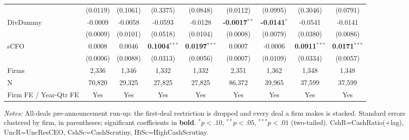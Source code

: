 \begin{landscape}
\begin{table}[htbp]
\begin{adjustbox}{max width=\linewidth}
\begin{tabular}{lcccccccc}
 & (0.0119) & (0.1061) & (0.3375) & (0.0848) & (0.0112) & (0.0995) & (0.3046) & (0.0791)  \\
DivDummy & -0.0009 & -0.0058 & -0.0593 & -0.0128 & \textbf{-0.0017}$^{**}$ & \textbf{-0.0141}$^{*}$ & -0.0541 & -0.0141  \\
 & (0.0009) & (0.0101) & (0.0518) & (0.0104) & (0.0008) & (0.0079) & (0.0380) & (0.0086)  \\
sCFO & 0.0008 & 0.0046 & \textbf{0.1004}$^{***}$ & \textbf{0.0197}$^{***}$ & 0.0007 & -0.0006 & \textbf{0.0911}$^{***}$ & \textbf{0.0171}$^{***}$  \\
 & (0.0006) & (0.0088) & (0.0313) & (0.0056) & (0.0007) & (0.0109) & (0.0334) & (0.0057)  \\
\midrule
Firms & 2,336 & 1,346 & 1,332 & 1,332 & 2,351 & 1,362 & 1,348 & 1,348  \\
N & 70,820 & 29,325 & 27,825 & 27,825 & 86,372 & 39,965 & 37,599 & 37,599  \\
\midrule
Firm FE / Year-Qtr FE & Yes & Yes & Yes & Yes & Yes & Yes & Yes & Yes \\
\bottomrule\end{tabular}\end{adjustbox}
\begin{minipage}{\linewidth}\vspace{2pt}\scriptsize\textit{Notes:} All-deals pre-announcement run-up: the first-deal restriction is dropped and every deal a firm makes is stacked. Standard errors clustered by firm, in parentheses; significant coefficients in \textbf{bold}. $^{*}p<.10$, $^{**}p<.05$, $^{***}p<.01$ (two-tailed). CshR=CashRatio(+lag), UncR=UncResCEO, CshSc=CashScrutiny, HiSc=HighCashScrutiny.\end{minipage}\end{table}
\end{landscape}

\clearpage


